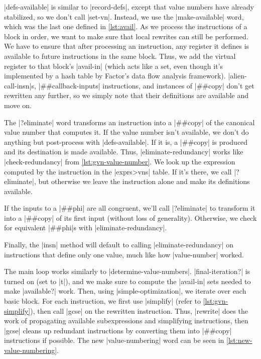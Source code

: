 \factor|defs-available| is similar to \factor|record-defs|, except that value
numbers have already stabilized, so we don't call \factor|set-vn|.  Instead, we
use the \factor|make-available| word, which was the last one defined in
\vref{lst:avail}.  As we process the instructions of a block in order, we want
to make sure that local rewrites can still be performed.  We have to ensure
that after processing an instruction, any register it defines is available to
future instructions in the same block.  Thus, we add the virtual register to
that block's \factor|avail-in| (which acts like a set, even though it's
implemented by a hash table by Factor's data flow analysis framework).
\factor|alien-call-insn|s, \factor|##callback-inputs| instructions, and
instances of \factor|##copy| don't get rewritten any further, so we simply note
that their definitions are available and move on.

The \factor|?eliminate| word transforms an instruction into a \factor|##copy|
of the canonical value number that computes it.  If the value number isn't
available, we don't do anything but post-process with \factor|defs-available|.
If it is, a \factor|##copy| is produced and its destination is made available.
Thus, \factor|eliminate-redundancy| works like \factor|check-redundancy| from
\vref{lst:gvn-value-number}.  We look up the expression computed by the
instruction in the \factor|exprs>vns| table.  If it's there, we call
\factor|?eliminate|, but otherwise we leave the instruction alone and make its
definitions available.

If the inputs to a \factor|##phi| are all congruent, we'll call
\factor|?eliminate| to transform it into a \factor|##copy| of its first input
(without loss of generality).  Otherwise, we check for equivalent
\factor|##phi|s with \factor|eliminate-redundancy|.

Finally, the \factor|insn| method will default to calling
\factor|eliminate-redundancy| on instructions that define only one value, much
like how \factor|value-number| worked.


The main loop works similarly to \factor|determine-value-numbers|.
\factor|final-iteration?| is turned on (set to \factor|t|), and we make sure to
compute the \factor|avail-in| sets needed to make \factor|available?| work.
Then, using \factor|simple-optimization|, we iterate over each basic block.
For each instruction, we first use \factor|simplify| (refer to
\vref{lst:gvn-simplify}), then call \factor|gcse| on the rewritten instruction.
Thus, \factor|rewrite| does the work of propagating available subexpressions
and simplifying instructions, then \factor|gcse| cleans up redundant
instructions by converting them into \factor|##copy| instructions if possible.
The new \factor|value-numbering| word can be seen in
\vref{lst:new-value-numbering}.

